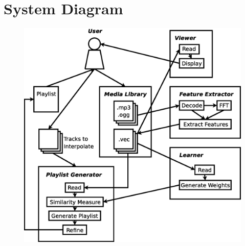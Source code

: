 \chapter{System Diagram}
\label{app:system_diagram}
\begin{figure}[!hbp]
	\includegraphics[width=\textwidth]{appendicies/system}
	\label{fig:dia:system}
\end{figure}
